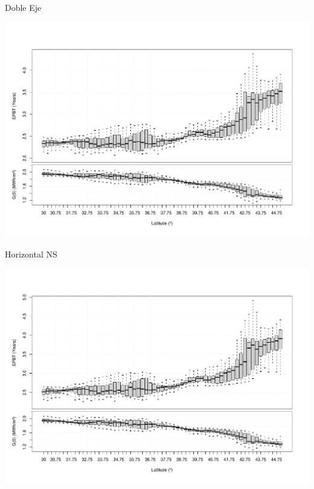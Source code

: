 \documentclass[xcolor={usenames,svgnames,dvipsnames}]{beamer}
\begin{document}
\begin{frame}[label={sec:org71816a9}]{Doble Eje}
\begin{center}
\includegraphics[width=.9\linewidth]{../figs/BoxPlotEPBTEuropa_2x.pdf}
\end{center}
\end{frame}

\begin{frame}[label={sec:org1943512}]{Horizontal NS}
\begin{center}
\includegraphics[width=.9\linewidth]{../figs/BoxPlotEPBTEuropa_HorizNS.pdf}
\end{center}
\end{frame}
\end{document}
